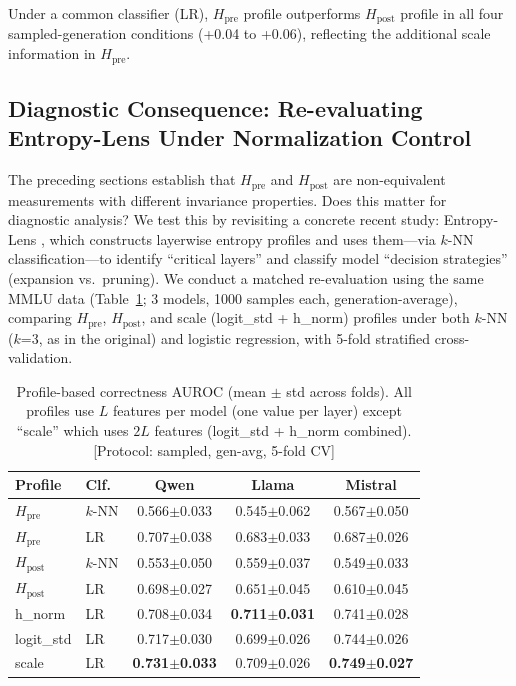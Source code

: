 \documentclass{ieeeaccess}
\newcommand{\Hpre}{H_{\text{pre}}}
\newcommand{\Hpost}{H_{\text{post}}}
\begin{document}
Under a common classifier (LR), $\Hpre$ profile outperforms $\Hpost$ profile in all four sampled-generation conditions (+0.04 to +0.06), reflecting the additional scale information in $\Hpre$.

\subsection{Diagnostic Consequence: Re-evaluating Entropy-Lens Under Normalization Control}
\label{sec:reeval}

The preceding sections establish that $\Hpre$ and $\Hpost$ are non-equivalent measurements with different invariance properties. Does this matter for diagnostic analysis? We test this by revisiting a concrete recent study: Entropy-Lens \cite{ali2025entropylens}, which constructs layerwise entropy profiles and uses them---via $k$-NN classification---to identify ``critical layers'' and classify model ``decision strategies'' (expansion vs.\ pruning). We conduct a matched re-evaluation using the same MMLU data (Table~\ref{tab:profile_reeval}; 3 models, 1000 samples each, generation-average), comparing $\Hpre$, $\Hpost$, and scale (logit\_std + h\_norm) profiles under both $k$-NN ($k$=3, as in the original) and logistic regression, with 5-fold stratified cross-validation.

\begin{table}[!ht]
\centering
\caption{Profile-based correctness AUROC (mean $\pm$ std across folds). All profiles use $L$ features per model (one value per layer) except ``scale'' which uses $2L$ features (logit\_std + h\_norm combined). [Protocol: sampled, gen-avg, 5-fold CV]}
\label{tab:profile_reeval}
\footnotesize
\setlength{\tabcolsep}{1.5pt}
\begin{tabular}{ll ccc}
\toprule
Profile & Clf. & Qwen & Llama & Mistral \\
\midrule
$\Hpre$ & $k$-NN & 0.566$\pm$0.033 & 0.545$\pm$0.062 & 0.567$\pm$0.050 \\
$\Hpre$ & LR & 0.707$\pm$0.038 & 0.683$\pm$0.033 & 0.687$\pm$0.026 \\
$\Hpost$ & $k$-NN & 0.553$\pm$0.050 & 0.559$\pm$0.037 & 0.549$\pm$0.033 \\
$\Hpost$ & LR & 0.698$\pm$0.027 & 0.651$\pm$0.045 & 0.610$\pm$0.045 \\
h\_norm & LR & 0.708$\pm$0.034 & \textbf{0.711$\pm$0.031} & 0.741$\pm$0.028 \\
logit\_std & LR & 0.717$\pm$0.030 & 0.699$\pm$0.026 & 0.744$\pm$0.026 \\
scale & LR & \textbf{0.731$\pm$0.033} & 0.709$\pm$0.026 & \textbf{0.749$\pm$0.027} \\
\bottomrule
\end{tabular}
\end{table}
\end{document}
